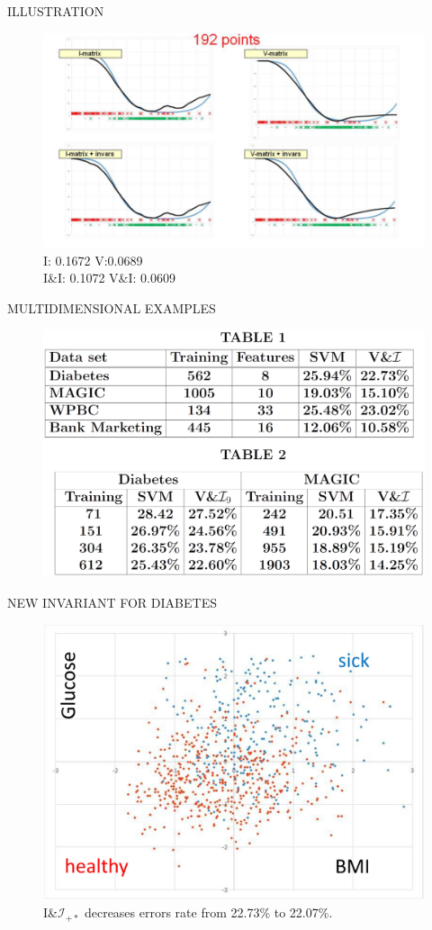 \documentclass[11pt]{beamer}
\begin{document}
\begin{frame}{ILLUSTRATION}
\begin{figure}
\includegraphics[width=1\linewidth]{Imgs/lusi-fig3.png}
I: 0.1672 \quad V:0.0689\\
I\&I: 0.1072 \quad V\&I: 0.0609
\end{figure}
\end{frame}

\begin{frame}{MULTIDIMENSIONAL EXAMPLES}
\begin{figure}
\includegraphics[width=.8\linewidth]{Imgs/table1and2.png}
\end{figure}
\end{frame}

\begin{frame}{NEW INVARIANT FOR DIABETES}
\begin{figure}
\includegraphics[width=.8\linewidth]{Imgs/BMI-Glucose-for-ylable(healthy-vs-sick).png}
I\&$\mathcal{I}_{+*}$ decreases errors rate from 22.73\% to 22.07\%.
\end{figure}
\end{frame}
\end{document}
